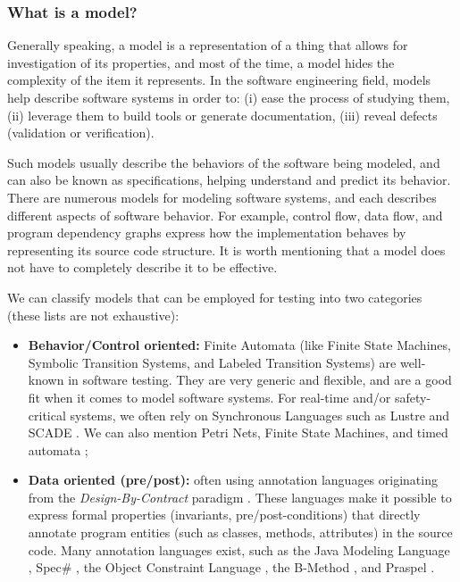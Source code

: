 \subsubsection{What is a model?}
\label{sec:related:testing:model}

Generally speaking, a model is a representation of a thing that
allows for investigation of its properties, and most of the time,
a model hides the complexity of the item it represents. In the
software engineering field, models help describe software systems
in order to: (i) ease the process of studying them, (ii) leverage
them to build tools or generate documentation, (iii) reveal
defects (validation or verification).

Such models usually describe the behaviors of the software being
modeled, and can also be known as specifications, helping
understand and predict its behavior. There are numerous models for
modeling software systems, and each describes different aspects
of software behavior. For example, control flow, data flow, and
program dependency graphs express how the implementation behaves
by representing its source code structure. It is worth mentioning
that a model does not have to completely describe it to be
effective.

We can classify models that can be employed for testing into two
categories (these lists are not exhaustive):

\begin{itemize}
    \item \textbf{Behavior/Control oriented:} Finite Automata (like
        Finite State Machines, Symbolic Transition Systems, and Labeled
        Transition Systems) are well-known in software testing. They are
        very generic and flexible, and are a good fit when it comes to
        model software systems. For real-time and/or safety-critical
        systems, we often rely on Synchronous Languages such as Lustre
        \cite{lustre:ieee} and SCADE
        \cite{LeSergent:2011:SCF:2188575.2188578}. We can also mention
        Petri Nets, Finite State Machines, and timed automata
        \cite{Alur94atheory};

    \item \textbf{Data oriented (pre/post):} often using annotation
        languages originating from the \textit{Design-By-Contract}
        paradigm \cite{Meyer:1992:ADC:618974.619797}. These languages
        make it possible to express formal properties (invariants,
        pre/post-conditions) that directly annotate program entities
        (such as classes, methods, attributes) in the source code. Many
        annotation languages exist, such as the Java Modeling Language
        \cite{jml}, Spec\# \cite{117852}, the Object Constraint Language
        \cite{Warmer:1998:OCL:291202}, the B-Method
        \cite{Lano:1996:BLM:525749}, and Praspel
\cite{Enderlin:2011:PSL:2075545.2075551}.
\end{itemize}

